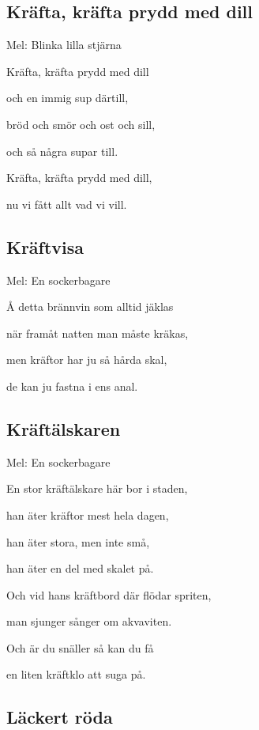 

\pagestyle{Kräftskivan}



\subsection{\textbf{Kräfta, kräfta prydd med dill}}

Mel: Blinka lilla stjärna\bigskip

Kräfta, kräfta prydd med dill

och en immig sup därtill,

bröd och smör och ost och sill,

och så några supar till.

Kräfta, kräfta prydd med dill,

nu vi fått allt vad vi vill. 

\subsection{\textbf{Kräftvisa}}

Mel: En sockerbagare\bigskip

Å detta brännvin som alltid jäklas

när framåt natten man måste kräkas,

men kräftor har ju så hårda skal,

de kan ju fastna i ens anal. 

\subsection{\textbf{Kräftälskaren}}

Mel: En sockerbagare \bigskip

En stor kräftälskare här bor i staden,

han äter kräftor mest hela dagen,

han äter stora, men inte små,

han äter en del med skalet på.

Och vid hans kräftbord där flödar spriten,

man sjunger sånger om akvaviten.

Och är du snäller så kan du få

en liten kräftklo att suga på.

\subsection{\textbf{Läckert röda }}


